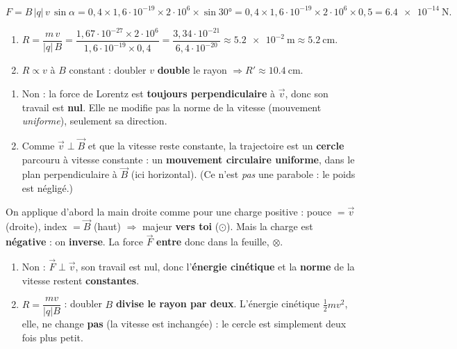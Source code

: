 \documentclass[11pt,a4paper]{article}
\newcommand{\vv}[1]{\vec{#1}}\newcommand{\ds}{\displaystyle}
\begin{document}
\begin{corrige}
\[ F=B\,|q|\,v\,\sin\alpha=0{,}4\times1{,}6\cdot10^{-19}\times2\cdot10^{6}\times\sin\ang{30}
    =0{,}4\times1{,}6\cdot10^{-19}\times2\cdot10^{6}\times0{,}5=\qty{6.4e-14}{\newton}. \]
\end{corrige}

\begin{corrige}
\begin{enumerate}[label=\alph*)]
  \item $R=\dfrac{m\,v}{|q|\,B}=\dfrac{1{,}67\cdot10^{-27}\times2\cdot10^{6}}{1{,}6\cdot10^{-19}\times0{,}4}
        =\dfrac{3{,}34\cdot10^{-21}}{6{,}4\cdot10^{-20}}\approx\qty{5.2e-2}{\metre}\approx\qty{5.2}{\centi\metre}.$
  \item $R\propto v$ à $B$ constant : doubler $v$ \textbf{double} le rayon $\Rightarrow R'\approx\qty{10.4}{\centi\metre}$.
\end{enumerate}
\end{corrige}

\begin{corrige}
\begin{enumerate}[label=\alph*)]
  \item Non : la force de Lorentz est \textbf{toujours perpendiculaire} à $\vv{v}$, donc son travail est
        \textbf{nul}. Elle ne modifie pas la norme de la vitesse (mouvement \emph{uniforme}), seulement
        sa direction.
  \item Comme $\vv{v}\perp\vv{B}$ et que la vitesse reste constante, la trajectoire est un
        \textbf{cercle} parcouru à vitesse constante : un \textbf{mouvement circulaire uniforme}, dans
        le plan perpendiculaire à $\vv{B}$ (ici horizontal). (Ce n'est \emph{pas} une parabole : le poids
        est négligé.)
\end{enumerate}
\end{corrige}

\begin{corrige}
On applique d'abord la main droite comme pour une charge positive : pouce $=\vv{v}$ (droite),
index $=\vv{B}$ (haut) $\Rightarrow$ majeur \textbf{vers toi} ($\odot$). Mais la charge est
\textbf{négative} : on \textbf{inverse}. La force $\vv{F}$ \textbf{entre} donc dans la feuille,
$\otimes$.
\end{corrige}

\begin{corrige}
\begin{enumerate}[label=\alph*)]
  \item Non : $\vv{F}\perp\vv{v}$, son travail est nul, donc l'\textbf{énergie cinétique} et la
        \textbf{norme} de la vitesse restent \textbf{constantes}.
  \item $R=\dfrac{mv}{|q|B}$ : doubler $B$ \textbf{divise le rayon par deux}. L'énergie cinétique
        $\tfrac12 mv^2$, elle, ne change \textbf{pas} (la vitesse est inchangée) : le cercle est
        simplement deux fois plus petit.
\end{enumerate}
\end{corrige}
\end{document}
